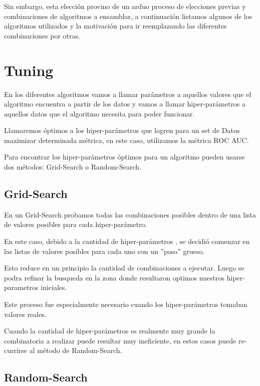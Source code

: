 \documentclass[a4paper ,12pt]{article}
\begin{document}
Sin embargo, esta elección provino de un arduo proceso de elecciones previas y combinaciones de algoritmos a ensamblar, a continuación listamos algunos de los algoritmos utilizados y la motivación para ir reemplazando las diferentes combinaciones por otras.



\newpage
\section{Tuning}

En los diferentes algoritmos vamos a llamar parámetros a aquellos valores que el algoritmo encuentra a partir de los datos y vamos a llamar hiper-parámetros a
aquellos datos que el algoritmo necesita para poder funcionar.

Llamaremos óptimos a los hiper-parámetros que logren para un set de Datos maximizar determinada métrica, en este caso, utilizamos la métrica ROC AUC.\

Para encontrar los hiper-parámetros óptimos para un algoritmo pueden usarse dos métodos: Grid-Search o Random-Search.\\

\subsection{Grid-Search}

En un Grid-Search probamos todas las combinaciones posibles dentro de una lista de valores posibles para cada hiper-parámetro.

En este caso, debido a la cantidad de hiper-parámetros , se decidió comenzar en las listas de valores posibles para cada uno con un ”paso” grueso.

Esto reduce en un principio la cantidad de combinaciones a ejecutar. Luego se podra refinar la busqueda en la zona donde resultaron optimos nuestros hiper-parametros iniciales.

Este proceso fue especialmente necesario cuando los hiper-parámetros tomaban valores reales.

Cuando la cantidad de hiper-parámetros es realmente muy grande la combinatoria a realizar puede resultar muy ineficiente, en estos casos puede re-
currirse al método de Random-Search.

\subsection{Random-Search}
\end{document}
